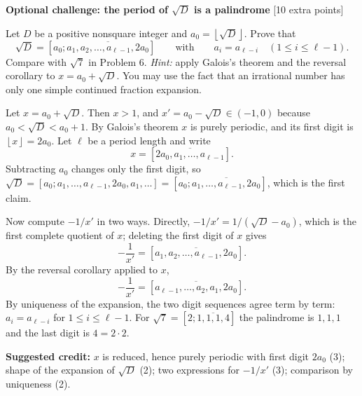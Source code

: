 \documentclass[11pt,letterpaper]{article}
\newcommand{\floor}[1]{\left\lfloor #1\right\rfloor}
\newcommand{\per}[1]{\overline{#1}}
\newcommand{\pts}[1]{\hfill\textcolor{muted}{\small[#1 points]}}
\begin{document}
\par\addvspace{12pt}
{\bfseries\color{teal}Optional challenge: the period of $\sqrt D$ is a palindrome}
\pts{10 extra}

Let $D$ be a positive nonsquare integer and $a_0=\floor{\sqrt D}$. Prove that
\[
  \sqrt D=[a_0;\per{a_1,a_2,\ldots,a_{\ell-1},2a_0}]
  \qquad\text{with}\qquad a_i=a_{\ell-i}\quad(1\le i\le\ell-1).
\]
Compare with $\sqrt7$ in Problem 6. \emph{Hint:} apply Galois's theorem and
the reversal corollary to $x=a_0+\sqrt D$. You may use the fact that an
irrational number has only one simple continued fraction expansion.
\begin{solution}
Let $x=a_0+\sqrt D$. Then $x>1$, and $x'=a_0-\sqrt D\in(-1,0)$ because
$a_0<\sqrt D<a_0+1$. By Galois's theorem $x$ is purely periodic, and its
first digit is $\floor x=2a_0$. Let $\ell$ be a period length and write
\[
  x=[\per{2a_0,a_1,\ldots,a_{\ell-1}}].
\]
Subtracting $a_0$ changes only the first digit, so
$\sqrt D=[a_0;a_1,\ldots,a_{\ell-1},2a_0,a_1,\ldots]
=[a_0;\per{a_1,\ldots,a_{\ell-1},2a_0}]$, which is the first claim.

Now compute $-1/x'$ in two ways. Directly,
$-1/x'=1/(\sqrt D-a_0)$, which is the first complete quotient of $x$;
deleting the first digit of $x$ gives
\[
  -\frac1{x'}=[\per{a_1,a_2,\ldots,a_{\ell-1},2a_0}].
\]
By the reversal corollary applied to $x$,
\[
  -\frac1{x'}=[\per{a_{\ell-1},\ldots,a_2,a_1,2a_0}].
\]
By uniqueness of the expansion, the two digit sequences agree term by term:
$a_i=a_{\ell-i}$ for $1\le i\le\ell-1$. For $\sqrt7=[2;\per{1,1,1,4}]$ the
palindrome is $1,1,1$ and the last digit is $4=2\cdot2$.

\textbf{Suggested credit:} $x$ is reduced, hence purely periodic with first
digit $2a_0$ (3); shape of the expansion of $\sqrt D$ (2); two expressions
for $-1/x'$ (3); comparison by uniqueness (2).
\end{solution}
\end{document}
